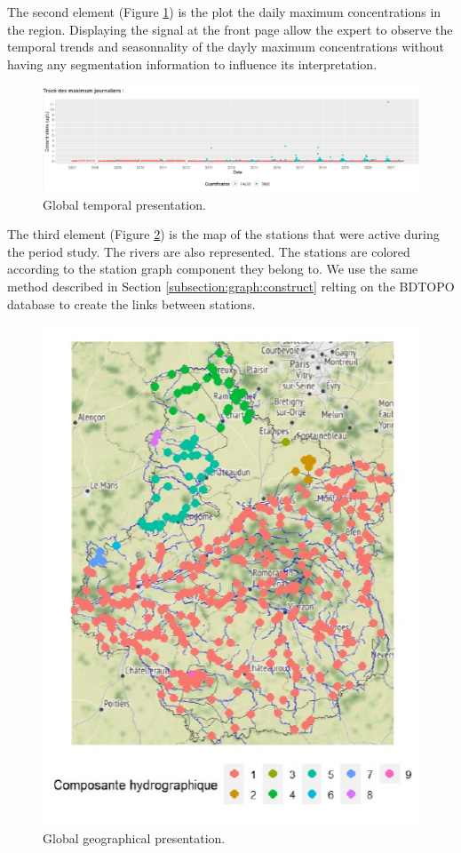 The second element (Figure \ref{fig:Imapp1}) is the plot the daily maximum concentrations in the region. Displaying the signal at the front page allow the expert to observe the temporal trends and seasonnality of the dayly maximum concentrations without having any segmentation information to influence its interpretation.

\begin{figure}[htbp]
  \centering
  \includegraphics[]{figs/Chap6/Im_app1.pdf}
  \caption{Global temporal presentation.}
  \label{fig:Imapp1}
\end{figure}

The third element (Figure \ref{fig:Imapp2}) is the map of the stations that were active during the period study. The rivers are also represented. The stations are colored according to the station graph component they belong to. We use the same method described in Section \ref{subsection:graph:construct} relting on the BDTOPO database to create the links between stations. 

\begin{figure}[htbp]
  \centering
  \includegraphics{figs/Chap6/Im_app2.pdf}
  \caption{Global geographical presentation.}
  \label{fig:Imapp2}
\end{figure}

